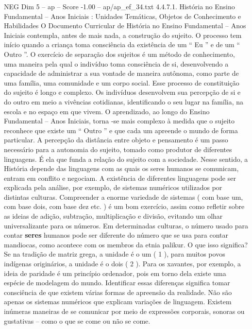 \begin{textsample}{NEG Dim 5 – ap – Score -1.00 – ap/ap\_ef\_34.txt}  \label{ex:f5_neg_125}
4.4.7.1.
História no Ensino Fundamental – Anos Iniciais : Unidades Temáticas, Objetos de Conhecimento e Habilidades O Documento Curricular de História no Ensino Fundamental – Anos Iniciais contempla, antes de mais nada, a construção do sujeito.
O processo tem início quando a criança toma consciência da existência de um “ Eu ” e de um “ Outro ”.
O exercício de separação dos sujeitos é um método de conhecimento, uma maneira pela qual o indivíduo toma consciência de si, desenvolvendo a capacidade de administrar a sua vontade de maneira autônoma, como parte de uma família, uma comunidade e um corpo social.
Esse processo de constituição do sujeito é longo e complexo.
Os indivíduos desenvolvem sua percepção de si e do outro em meio a vivências cotidianas, identificando o seu lugar na família, na escola e no espaço em que vivem.
O aprendizado, ao longo do Ensino Fundamental – Anos Iniciais, torna -se mais complexo à medida que o sujeito reconhece que existe um “ Outro ” e que cada um apreende o mundo de forma particular.
A percepção da distância entre objeto e pensamento é um passo necessário para a autonomia do sujeito, tomado como produtor de diferentes linguagens.
É ela que funda a relação do sujeito com a sociedade.
Nesse sentido, a História depende das linguagens com as quais os seres humanos se comunicam, entram em conflito e negociam.
A existência de diferentes linguagens pode ser explicada pela análise, por exemplo, de sistemas numéricos utilizados por distintas culturas.
Compreender a enorme variedade de sistemas ( com base um, com base dois, com base dez etc. ) é um bom exercício, assim como refletir sobre as ideias de adição, subtração, multiplicação e divisão, evitando um olhar universalizante para os números.
Em determinadas culturas, o número usado para contar \textbf{seres} humanos pode ser diferente do número que se usa para contar mandiocas, como acontece com os membros da etnia palikur.
O que isso significa?
Se na tradição de matriz grega, a unidade é o um ( 1 ), para muitos povos indígenas originários, a unidade é o dois ( 2 ).
Para os xavantes, por exemplo, a ideia de paridade é um princípio ordenador, pois em torno dela existe uma espécie de modelagem do mundo.
Identificar essas diferenças significa tomar consciência de que existem várias formas de apreensão da realidade.
Não são apenas os sistemas numéricos que explicam variações de linguagem.
Existem inúmeras maneiras de se comunicar por meio de expressões corporais, sonoras ou gustativas – como o que se come ou não se come.

\end{textsample}
